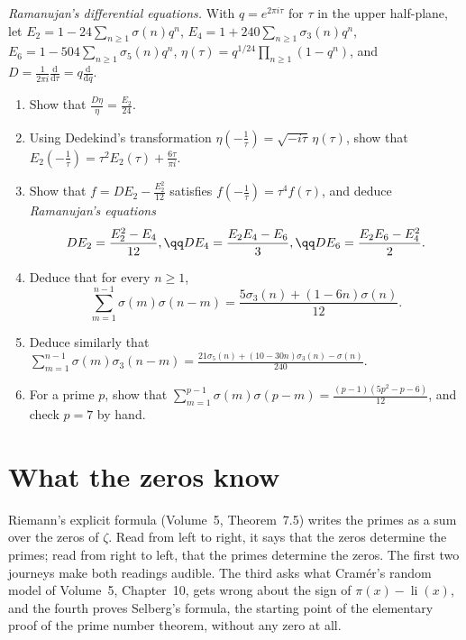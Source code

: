 \begin{exercise}[Journey]\label{pb:ramanujanE2}
\emph{Ramanujan's differential equations.} With $q=e^{2\pi i\tau}$ for $\tau$ in the upper half-plane, let $E_2=1-24\sum_{n\ge1}\sigma(n)q^n$, $E_4=1+240\sum_{n\ge1}\sigma_3(n)q^n$,
$E_6=1-504\sum_{n\ge1}\sigma_5(n)q^n$, $\eta(\tau)=q^{1/24}\prod_{n\ge1}(1-q^n)$, and $D=\frac1{2\pi i}\frac{\mathrm d}{\mathrm d\tau}=q\frac{\mathrm d}{\mathrm dq}$.
\begin{enumerate}[label=(\alph*)]
\item Show that $\frac{D\eta}\eta=\frac{E_2}{24}$.
\item Using Dedekind's transformation $\eta(-\frac1\tau)=\sqrt{-i\tau}\,\eta(\tau)$, show that $E_2(-\frac1\tau)=\tau^2E_2(\tau)+\frac{6\tau}{\pi i}$.
\item Show that $f=DE_2-\frac{E_2^2}{12}$ satisfies $f(-\frac1\tau)=\tau^4f(\tau)$, and deduce \emph{Ramanujan's equations}
\[
DE_2=\frac{E_2^2-E_4}{12},\qq DE_4=\frac{E_2E_4-E_6}3,\qq DE_6=\frac{E_2E_6-E_4^2}2.
\]
\item Deduce that for every $n\ge1$,
\[
\sum_{m=1}^{n-1}\sigma(m)\sigma(n-m)=\frac{5\sigma_3(n)+(1-6n)\sigma(n)}{12}.
\]
\item Deduce similarly that $\sum_{m=1}^{n-1}\sigma(m)\sigma_3(n-m)=\frac{21\sigma_5(n)+(10-30n)\sigma_3(n)-\sigma(n)}{240}$.
\item For a prime $p$, show that $\sum_{m=1}^{p-1}\sigma(m)\sigma(p-m)=\frac{(p-1)(5p^2-p-6)}{12}$, and check $p=7$ by hand.
\end{enumerate}
\end{exercise}

\section{What the zeros know}

Riemann's explicit formula (Volume~5, Theorem~7.5) writes the primes as a sum over the zeros of $\zeta$. Read from left to right, it says that the zeros determine the primes;
read from right to left, that the primes determine the zeros. The first two journeys make both readings audible. The third asks what Cramér's random model of Volume~5,
Chapter~10, gets wrong about the sign of $\pi(x)-\operatorname{li}(x)$, and the fourth proves Selberg's formula, the starting point of the elementary proof of the
prime number theorem, without any zero at all.

